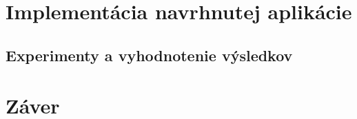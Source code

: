 \chapter{Implementácia navrhnutej aplikácie}

\section{Experimenty a vyhodnotenie výsledkov}

\chapter{Záver}



%


